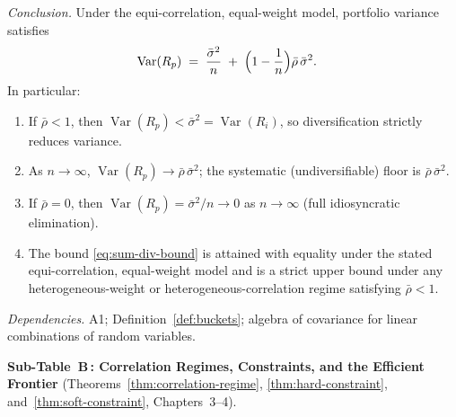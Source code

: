 \documentclass[12pt,openany]{book}
\DeclareMathOperator{\Var}{Var}
\numberwithin{equation}{chapter}
\theoremstyle{plain}
\theoremstyle{definition}
\theoremstyle{remark}
\begin{document}
\begin{enumerate}[label=\textbf{A\arabic*.}, leftmargin=*, widest=A2,
                  itemsep=6pt, parsep=2pt]
        \emph{Conclusion.}
        Under the equi-correlation, equal-weight model,
        portfolio variance satisfies
        \begin{align}
          \Var(R_p)
            &\;=\;
              \frac{\bar{\sigma}^2}{n}
              \;+\;
              \Bigl(1 - \frac{1}{n}\Bigr)\bar{\rho}\,\bar{\sigma}^2.
          \label{eq:sum-div-bound}
        \end{align}
        In particular:
        \begin{enumerate}[label=(\alph*), itemsep=2pt]
          \item If $\bar{\rho} < 1$, then
                $\Var(R_p) < \bar{\sigma}^2 = \Var(R_i)$, so
                diversification strictly reduces variance.
          \item As $n \to \infty$,
                $\Var(R_p) \to \bar{\rho}\,\bar{\sigma}^2$;
                the systematic (undiversifiable) floor is
                $\bar{\rho}\,\bar{\sigma}^2$.
          \item If $\bar{\rho} = 0$, then
                $\Var(R_p) = \bar{\sigma}^2/n \to 0$ as
                $n \to \infty$ (full idiosyncratic elimination).
          \item The bound \eqref{eq:sum-div-bound} is attained with
                equality under the stated equi-correlation,
                equal-weight model and is a strict upper bound under
                any heterogeneous-weight or heterogeneous-correlation
                regime satisfying $\bar{\rho} < 1$.
        \end{enumerate}

        \emph{Dependencies.} A1; Definition~\ref{def:buckets};
        algebra of covariance for linear combinations of random
        variables.

\end{enumerate}

\bigskip
\noindent\textbf{Sub-Table~B\,: Correlation Regimes, Constraints,
and the Efficient Frontier} (Theorems~\ref{thm:correlation-regime},
\ref{thm:hard-constraint}, and~\ref{thm:soft-constraint},
Chapters~3--4).
\end{document}
